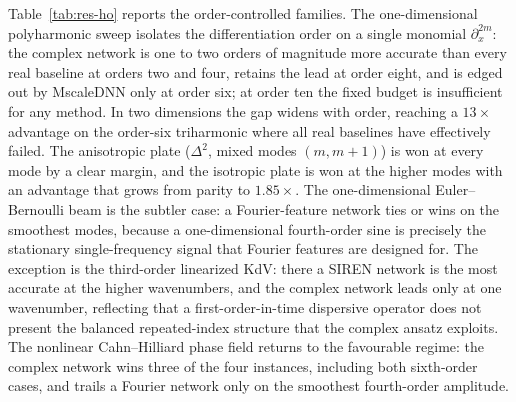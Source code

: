Table~\ref{tab:res-ho} reports the order-controlled families. The one-dimensional
polyharmonic sweep isolates the differentiation order on a single monomial
\(\partial_x^{2m}\): the complex network is one to two orders of magnitude more
accurate than every real baseline at orders two and four, retains the lead at
order eight, and is edged out by MscaleDNN only at order six; at order ten the
fixed budget is insufficient for any method. In two dimensions the gap widens
with order, reaching a \(13\times\) advantage on the order-six triharmonic where
all real baselines have effectively failed. The anisotropic plate
(\(\Delta^2\), mixed modes \((m,m{+}1)\)) is won at every mode by a clear margin,
and the isotropic plate is won at the higher modes with an advantage that grows
from parity to \(1.85\times\). The one-dimensional Euler--Bernoulli beam is the
subtler case: a Fourier-feature network ties or wins on the smoothest modes,
because a one-dimensional fourth-order sine is precisely the stationary
single-frequency signal that Fourier features are designed for.
The exception is the third-order linearized KdV: there a SIREN network is the
most accurate at the higher wavenumbers, and the complex network leads only at
one wavenumber, reflecting that a first-order-in-time dispersive operator does
not present the balanced repeated-index structure that the complex ansatz
exploits. The nonlinear Cahn--Hilliard phase field returns to the favourable
regime: the complex network wins three of the four instances, including both
sixth-order cases, and trails a Fourier network only on the smoothest
fourth-order amplitude.

